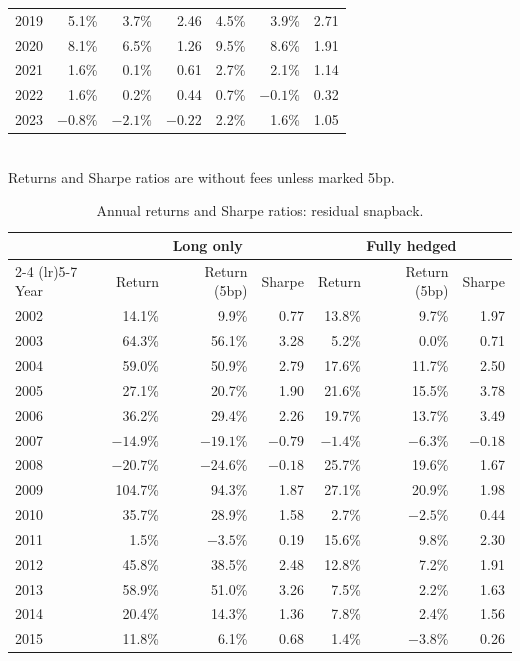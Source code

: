 \documentclass[11pt]{article}
\begin{document}
\begin{table}[H]
\begin{tabular}{lrrrrrr}
2019 & 5.1\% & 3.7\% & 2.46 & 4.5\% & 3.9\% & 2.71 \\
2020 & 8.1\% & 6.5\% & 1.26 & 9.5\% & 8.6\% & 1.91 \\
2021 & 1.6\% & 0.1\% & 0.61 & 2.7\% & 2.1\% & 1.14 \\
2022 & 1.6\% & 0.2\% & 0.44 & 0.7\% & $-0.1\%$ & 0.32 \\
2023 & $-0.8\%$ & $-2.1\%$ & $-0.22$ & 2.2\% & 1.6\% & 1.05 \\
\bottomrule
\end{tabular}
\\[4pt]
\small Returns and Sharpe ratios are without fees unless marked 5bp.
\end{table}

\begin{table}[H]
\centering
\caption{Annual returns and Sharpe ratios: residual snapback.}
\label{tab:yearly-snap}
\begin{tabular}{lrrrrrr}
\toprule
& \multicolumn{3}{c}{Long only} & \multicolumn{3}{c}{Fully hedged} \\
\cmidrule(lr){2-4} \cmidrule(lr){5-7}
Year & Return & Return (5bp) & Sharpe & Return & Return (5bp) & Sharpe \\
\midrule
2002 & 14.1\% & 9.9\% & 0.77 & 13.8\% & 9.7\% & 1.97 \\
2003 & 64.3\% & 56.1\% & 3.28 & 5.2\% & 0.0\% & 0.71 \\
2004 & 59.0\% & 50.9\% & 2.79 & 17.6\% & 11.7\% & 2.50 \\
2005 & 27.1\% & 20.7\% & 1.90 & 21.6\% & 15.5\% & 3.78 \\
2006 & 36.2\% & 29.4\% & 2.26 & 19.7\% & 13.7\% & 3.49 \\
2007 & $-14.9\%$ & $-19.1\%$ & $-0.79$ & $-1.4\%$ & $-6.3\%$ & $-0.18$ \\
2008 & $-20.7\%$ & $-24.6\%$ & $-0.18$ & 25.7\% & 19.6\% & 1.67 \\
2009 & 104.7\% & 94.3\% & 1.87 & 27.1\% & 20.9\% & 1.98 \\
2010 & 35.7\% & 28.9\% & 1.58 & 2.7\% & $-2.5\%$ & 0.44 \\
2011 & 1.5\% & $-3.5\%$ & 0.19 & 15.6\% & 9.8\% & 2.30 \\
2012 & 45.8\% & 38.5\% & 2.48 & 12.8\% & 7.2\% & 1.91 \\
2013 & 58.9\% & 51.0\% & 3.26 & 7.5\% & 2.2\% & 1.63 \\
2014 & 20.4\% & 14.3\% & 1.36 & 7.8\% & 2.4\% & 1.56 \\
2015 & 11.8\% & 6.1\% & 0.68 & 1.4\% & $-3.8\%$ & 0.26 \\

\end{tabular}
\end{table}
\end{document}
